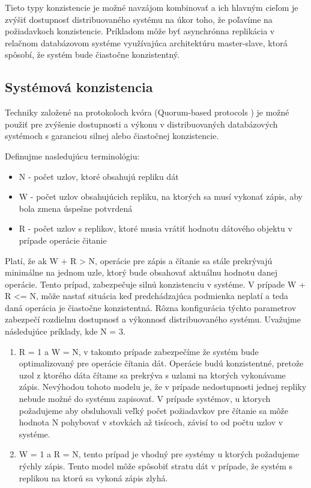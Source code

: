 \documentclass[11pt,twoside,a4paper]{book}
\begin{document}
Tieto typy konzistencie je možné navzájom kombinovať a ich hlavným cieľom je zvýšiť dostupnosť distribuovaného systému na úkor toho, že poľavíme na požiadavkoch konzistencie. Príkladom môže byť asynchrónna replikácia v relačnom databázovom systéme využívajúca architektúru master-slave, ktorá spôsobí, že systém bude čiastočne konzistentný.

\subsection{Systémová konzistencia}

Techniky založené na protokoloch kvóra (Quorum-based protocols \cite{gifford1979weighted}) je možné použiť pre zvýšenie dostupnosti a výkonu v distribuovaných databázových systémoch s garanciou silnej alebo čiastočnej konzistencie.

Definujme nasledujúcu terminológiu:
\begin{itemize}
 \item N - počet uzlov, ktoré obsahujú repliku dát
 \item W - počet uzlov obsahujúcich repliku, na ktorých sa musí vykonať zápis, aby bola zmena úspešne potvrdená
 \item R - počet uzlov s replikov, ktoré musia vrátiť hodnotu dátového objektu v prípade operácie čitanie
\end{itemize}

Platí, že ak W + R > N, operácie pre zápis a čítanie sa stále prekrývajú minimálne na jednom uzle, ktorý bude obsahovať aktuálnu hodnotu danej operácie. Tento prípad, zabezpečuje silnú konzistenciu v systéme. V prípade W + R <= N, môže nastať situácia keď predchádzajúca podmienka neplatí a teda daná operácia je čiastočne konzistentná. Rôzna konfigurácia týchto parametrov zabezpečí rozdielnu dostupnosť a výkonnosť distribuovaného systému.  Uvažujme následujúce príklady, kde N = 3.

\begin{enumerate}
 \item R = 1 a W = N, v takomto prípade zabezpečíme že systém bude optimalizovaný pre operácie čítania dát. Operácie budú konzistentné, pretože uzol z ktorého dáta čítame sa prekrýva s uzlami na ktorých vykonávame zápis. Nevýhodou tohoto modelu je, že v prípade nedostupnosti jednej repliky nebude možné do systému zapisovať. V prípade systémov, u ktorych požadujeme aby obsluhovali veľký počet požiadavkov pre čítanie sa môže hodnota N pohybovať v stovkách až tisícoch, závisí to od počtu uzlov v systéme.
 \item W = 1 a R = N, tento prípad je vhodný pre systémy u ktorých požadujeme rýchly zápis. Tento model môže spôsobiť stratu dát v prípade, že systém s replikou na ktorú sa vykoná zápis zlyhá. 
\end{enumerate}
\end{document}
